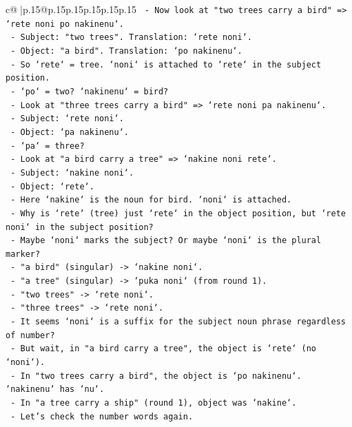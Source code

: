 \documentclass{article}
\begin{document}
{\begin{supertabular}{c@{$\;$}|p{.15\linewidth}@{}p{.15\linewidth}p{.15\linewidth}p{.15\linewidth}p{.15\linewidth}p{.15\linewidth}}
{{{\texttt{  {-} Now look at "two trees carry a bird" => `rete noni po nakinenu`.} \\
\texttt{    {-} Subject: "two trees". Translation: `rete noni`.} \\
\texttt{    {-} Object: "a bird". Translation: `po nakinenu`.} \\
\texttt{    {-} So `rete` = tree. `noni` is attached to `rete` in the subject position.} \\
\texttt{    {-} `po` = two? `nakinenu` = bird?} \\
\texttt{  {-} Look at "three trees carry a bird" => `rete noni pa nakinenu`.} \\
\texttt{    {-} Subject: `rete noni`.} \\
\texttt{    {-} Object: `pa nakinenu`.} \\
\texttt{    {-} `pa` = three?} \\
\texttt{  {-} Look at "a bird carry a tree" => `nakine noni rete`.} \\
\texttt{    {-} Subject: `nakine noni`.} \\
\texttt{    {-} Object: `rete`.} \\
\texttt{    {-} Here `nakine` is the noun for bird. `noni` is attached.} \\
\texttt{    {-} Why is `rete` (tree) just `rete` in the object position, but `rete noni` in the subject position?} \\
\texttt{    {-} Maybe `noni` marks the subject? Or maybe `noni` is the plural marker?} \\
\texttt{    {-} "a bird" (singular) {-}> `nakine noni`.} \\
\texttt{    {-} "a tree" (singular) {-}> `puka noni` (from round 1).} \\
\texttt{    {-} "two trees" {-}> `rete noni`.} \\
\texttt{    {-} "three trees" {-}> `rete noni`.} \\
\texttt{    {-} It seems `noni` is a suffix for the subject noun phrase regardless of number?} \\
\texttt{    {-} But wait, in "a bird carry a tree", the object is `rete` (no `noni`).} \\
\texttt{    {-} In "two trees carry a bird", the object is `po nakinenu`. `nakinenu` has `nu`.} \\
\texttt{    {-} In "a tree carry a ship" (round 1), object was `nakine`.} \\
\texttt{    {-} Let's check the number words again.} \\
}}}
\end{supertabular}}
\end{document}
